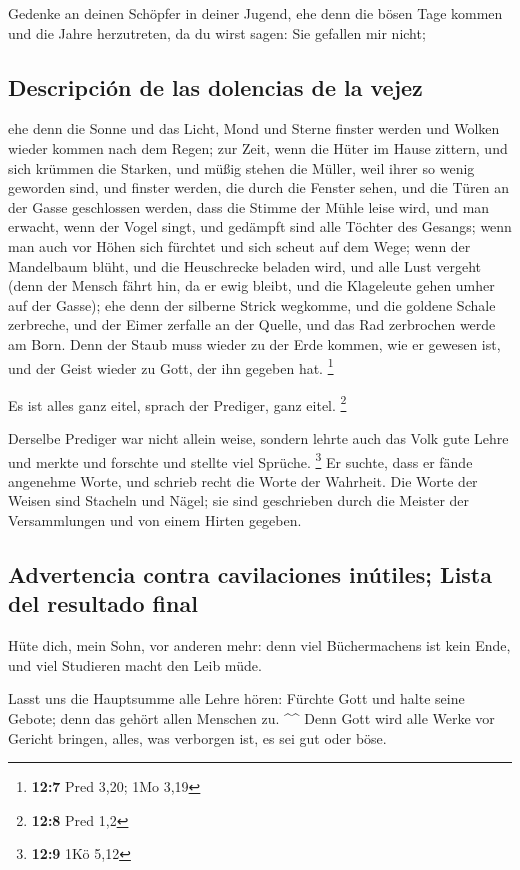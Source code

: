  Gedenke an deinen Schöpfer in deiner Jugend, ehe denn die
bösen Tage kommen und die Jahre herzutreten, da du wirst sagen: Sie
gefallen mir nicht;

\hypertarget{descripciuxf3n-de-las-dolencias-de-la-vejez}{%
\subsection{Descripción de las dolencias de la
vejez}\label{descripciuxf3n-de-las-dolencias-de-la-vejez}}

 ehe denn die Sonne und das Licht, Mond und Sterne finster
werden und Wolken wieder kommen nach dem Regen;  zur Zeit,
wenn die Hüter im Hause zittern, und sich krümmen die Starken, und müßig
stehen die Müller, weil ihrer so wenig geworden sind, und finster
werden, die durch die Fenster sehen,  und die Türen an der
Gasse geschlossen werden, dass die Stimme der Mühle leise wird, und man
erwacht, wenn der Vogel singt, und gedämpft sind alle Töchter des
Gesangs;  wenn man auch vor Höhen sich fürchtet und sich
scheut auf dem Wege; wenn der Mandelbaum blüht, und die Heuschrecke
beladen wird, und alle Lust vergeht (denn der Mensch fährt hin, da er
ewig bleibt, und die Klageleute gehen umher auf der Gasse);
 ehe denn der silberne Strick wegkomme, und die goldene
Schale zerbreche, und der Eimer zerfalle an der Quelle, und das Rad
zerbrochen werde am Born.  Denn der Staub muss wieder zu
der Erde kommen, wie er gewesen ist, und der Geist wieder zu Gott, der
ihn gegeben hat. \footnote{\textbf{12:7} Pred 3,20; 1Mo 3,19}

 Es ist alles ganz eitel, sprach der Prediger, ganz eitel.
\footnote{\textbf{12:8} Pred 1,2}

 Derselbe Prediger war nicht allein weise, sondern lehrte
auch das Volk gute Lehre und merkte und forschte und stellte viel
Sprüche. \footnote{\textbf{12:9} 1Kö 5,12}  Er suchte,
dass er fände angenehme Worte, und schrieb recht die Worte der Wahrheit.
 Die Worte der Weisen sind Stacheln und Nägel; sie sind
geschrieben durch die Meister der Versammlungen und von einem Hirten
gegeben.

\hypertarget{advertencia-contra-cavilaciones-inuxfatiles-lista-del-resultado-final}{%
\subsection{Advertencia contra cavilaciones inútiles; Lista del
resultado
final}\label{advertencia-contra-cavilaciones-inuxfatiles-lista-del-resultado-final}}

 Hüte dich, mein Sohn, vor anderen mehr: denn viel
Büchermachens ist kein Ende, und viel Studieren macht den Leib müde.

 Lasst uns die Hauptsumme alle Lehre hören: Fürchte Gott
und halte seine Gebote; denn das gehört allen Menschen zu. \^{}\^{}
 Denn Gott wird alle Werke vor Gericht bringen, alles,
was verborgen ist, es sei gut oder böse.
